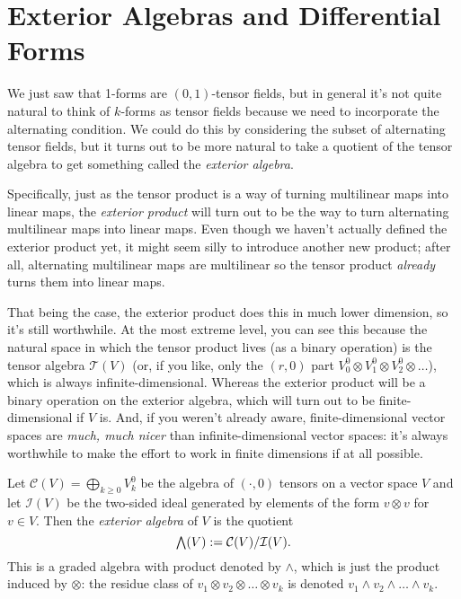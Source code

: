 
\section{Exterior Algebras and Differential Forms}

We just saw that 1-forms are $(0,1)$-tensor fields, but in general it's not quite natural to think of $k$-forms as tensor fields because we need to incorporate the alternating condition. We could do this by considering the subset of alternating tensor fields, but it turns out to be more natural to take a quotient of the tensor algebra to get something called the \emph{exterior algebra}.

Specifically, just as the tensor product is a way of turning multilinear maps into linear maps, the \emph{exterior product} will turn out to be the way to turn alternating multilinear maps into linear maps. Even though we haven't actually defined the exterior product yet, it might seem silly to introduce another new product; after all, alternating multilinear maps are multilinear so the tensor product \emph{already} turns them into linear maps.

That being the case, the exterior product does this in much lower dimension, so it's still worthwhile. At the most extreme level, you can see this because the natural space in which the tensor product lives (as a binary operation) is the tensor algebra $\mathcal{T}(V)$ (or, if you like, only the $(r,0)$ part $V_0^0 \otimes V_1^0 \otimes V_2^0 \otimes \dots$), which is always infinite-dimensional. Whereas the exterior product will be a binary operation on the exterior algebra, which will turn out to be finite-dimensional if $V$ is. And, if you weren't already aware, finite-dimensional vector spaces are \emph{much, much nicer} than infinite-dimensional vector spaces: it's always worthwhile to make the effort to work in finite dimensions if at all possible.

\begin{definition}\label{def:exterior algebra}
	Let $\mathcal{C}(V) = \bigoplus_{k \geq 0} V_k^0$ be the algebra of $(\cdot , 0)$ tensors on a vector space $V$ and let $\mathcal{I}(V)$ be the two-sided ideal generated by elements of the form $v \otimes v$ for $v \in V$. Then the \emph{exterior algebra} of $V$ is the quotient
	\[
		\ext{}(V) := \mathcal{C}(V)/\mathcal{I}(V).
	\]
	This is a graded algebra with product denoted by $\wedge$, which is just the product induced by $\otimes$: the residue class of $v_1 \otimes v_2 \otimes \dots \otimes v_k$ is denoted $v_1 \wedge v_2 \wedge \dots \wedge v_k$.
\end{definition}

